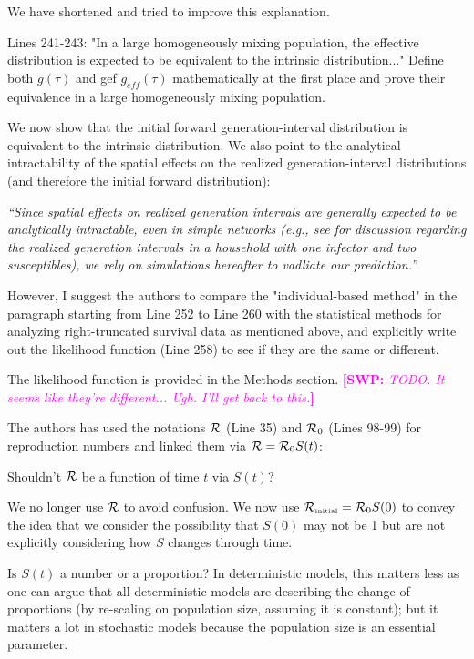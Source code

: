 \documentclass[12pt]{article}
\newcommand{\RR}{\ensuremath{{\cal R}}}
\newcommand{\Rx}[1]{\ensuremath{{\cal R}_{#1}}}
\newcommand{\Ro}{\Rx{0}}
\newcommand{\Rini}{\Rx{\textrm{\tiny initial}}}
\newcommand{\revtext}{\textsf}
\newcommand{\newtext}[1]{\textsl{``#1''}}
\newcommand{\comment}[3]{\textcolor{#1}{\textbf{[#2: }\textsl{#3}\textbf{]}}}
\newcommand{\swp}[1]{\comment{magenta}{SWP}{#1}}
\begin{document}
We have shortened and tried to improve this explanation. 

\revtext{Lines 241-243: "In a large homogeneously mixing population, the effective
distribution is expected to be equivalent to the intrinsic distribution..."
Define both $g(\tau)$ and gef $g_{eff}(\tau)$ mathematically at the first place and prove
their equivalence in a large homogeneously mixing population.}

We now show that the initial forward generation-interval distribution is equivalent to the intrinsic distribution.
We also point to the analytical intractability of the spatial effects on the realized generation-interval distributions (and therefore the initial forward distribution):

\newtext{Since spatial effects on realized generation intervals are generally expected to be analytically intractable, even in simple networks (e.g., see \cite{tomba2010some} for discussion regarding the realized generation intervals in a household with one infector and two susceptibles), we rely on simulations hereafter to vadliate our prediction.}

\revtext{However, I suggest the authors to compare the "individual-based
method" in the paragraph starting from Line 252 to Line 260 with the statistical methods for analyzing right-truncated survival data as mentioned
above, and explicitly write out the likelihood function (Line 258) to see if
they are the same or different.}

The likelihood function is provided in the Methods section.
\swp{TODO. It seems like they're different... Ugh. I'll get back to this.}

\revtext{The authors has used the notations $\RR$ (Line 35) and $\Ro$ (Lines 98-99) for reproduction numbers and
linked them via $\RR = \Ro S(t)$:}

\revtext{Shouldn't $\RR$ be a function of time $t$ via $S(t)$?}

We no longer use $\RR$ to avoid confusion. We now use $\Rini = \Ro S(0)$ to convey the idea that we consider the possibility that $S(0)$ may not be 1 but are not explicitly considering how $S$ changes through time.

\revtext{Is $S(t)$ a number or a proportion? In deterministic models, this matters
less as one can argue that all deterministic models are describing the
change of proportions (by re-scaling on population size, assuming it is
constant); but it matters a lot in stochastic models because the population
size is an essential parameter.}
\end{document}
